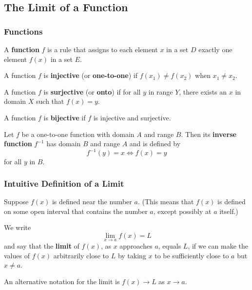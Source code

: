 \subsection{The Limit of a Function}

\subsubsection*{Functions}
\begin{definition}
    A \textbf{function} \(f\) is a rule that assigns to each element \(x\) in
    a set \(D\) exactly one element \(f(x)\) in a set \(E\).
\end{definition}
\begin{definition}
    A function \(f\) is \textbf{injective} (or \textbf{one-to-one}) if
    \(f(x_1)\neq f(x_2)\) when \(x_1\neq x_2\).
\end{definition}
\begin{definition}
    A function \(f\) is \textbf{surjective} (or \textbf{onto}) if for all
    \(y\) in range \(Y\),
    there exists an \(x\) in domain \(X\) such that \(f(x)=y\).
\end{definition}
\begin{definition}
    A function \(f\) is \textbf{bijective} if \(f\) is injective and
    surjective.
\end{definition}
\begin{definition}
    Let \(f\) be a one-to-one function with domain \(A\) and range \(B\).
    Then its \textbf{inverse function} \(f^{-1}\) has domain \(B\) and range
    \(A\) and is defined by
    \[f^{-1}(y)=x\iff f(x)=y\]
    for all \(y\) in \(B\).
\end{definition}

\subsubsection*{Intuitive Definition of a Limit}
Suppose \(f(x)\) is defined near the number \(a\).
(This means that \(f(x)\) is defined on some open interval that contains the
number \(a\),
except possibly at \(a\) itself.)
\begin{definition}
    We write
    \[\lim_{x\to a}f(x)=L\]
    and say that the \textbf{limit} of \(f(x)\),
    as \(x\) approaches \(a\),
    equals \(L\),
    if we can make the values of \(f(x)\) arbitrarily close to \(L\) by taking
    \(x\) to be sufficiently close to \(a\) but \(x\neq a\).
\end{definition}
An alternative notation for the limit is \(f(x)\to L\) as \(x\to a\).

